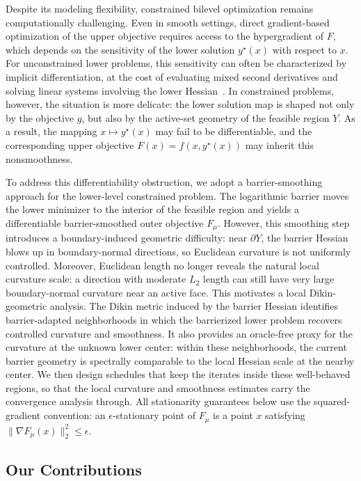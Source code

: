 \documentclass{article}
\begin{document}
Despite its modeling flexibility, constrained bilevel optimization remains computationally
challenging. Even in smooth settings, direct gradient-based optimization of the upper objective
requires access to the hypergradient of \(F\), which depends on the sensitivity of the lower solution
\(y^\star(x)\) with respect to \(x\). For unconstrained lower problems, this sensitivity can often be
characterized by implicit differentiation, at the cost of evaluating mixed second derivatives and
solving linear systems involving the lower Hessian~\citep{ghadimi2018approximation,ji2021bilevel}.
In constrained problems, however, the situation is more delicate: the lower solution map is shaped
not only by the objective \(g\), but also by the active-set geometry of the feasible region \(Y\). As a
result, the mapping \(x\mapsto y^\star(x)\) may fail to be differentiable, and the corresponding upper
objective \(F(x)=f(x,y^\star(x))\) may inherit this nonsmoothness.

To address this differentiability obstruction, we adopt a barrier-smoothing approach for the lower-level
constrained problem. The logarithmic barrier moves the lower minimizer to the interior of the feasible
region and yields a differentiable barrier-smoothed outer objective \(F_\mu\). However, this smoothing
step introduces a boundary-induced geometric difficulty: near \(\partial Y\), the barrier Hessian blows
up in boundary-normal directions, so Euclidean curvature is not uniformly controlled. Moreover,
Euclidean length no longer reveals the natural local curvature scale: a direction with moderate
\(L_2\) length can still have very large boundary-normal curvature near an active face.
This motivates a local Dikin-geometric analysis. The Dikin metric induced by the barrier Hessian
identifies barrier-adapted neighborhoods in which the barrierized lower problem recovers controlled
curvature and smoothness. It also provides an oracle-free proxy for the curvature at the unknown
lower center: within these neighborhoods, the current barrier geometry is spectrally comparable to the
local Hessian scale at the nearby center. We then design schedules that keep the iterates inside these
well-behaved regions, so that the local curvature and smoothness estimates carry the convergence
analysis through. All stationarity guarantees below use the squared-gradient convention: an
\(\epsilon\)-stationary point of \(F_\mu\) is a point \(x\) satisfying
\(\|\nabla F_\mu(x)\|_2^2\le\epsilon\).

\subsection{Our Contributions}
\end{document}
